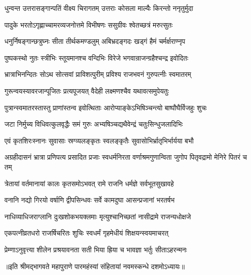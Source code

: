 \twolineshloka
{धुन्वन्त उत्तरासङ्गान्पतिं वीक्ष्य चिरागतम्}
{उत्तराः कोसला माल्यैः किरन्तो ननृतुर्मुदा} %

\twolineshloka
{पादुके भरतोऽगृह्णाच्चामरव्यजनोत्तमे}
{विभीषणः ससुग्रीवः श्वेतच्छत्रं मरुत्सुतः} %

\twolineshloka
{धनुर्निषङ्गान्छत्रुघ्नः सीता तीर्थकमण्डलुम्}
{अबिभ्रदङ्गदः खड्गं हैमं चर्मर्क्षराण्नृप} %

\twolineshloka
{पुष्पकस्थो नुतः स्त्रीभिः स्तूयमानश्च वन्दिभिः}
{विरेजे भगवान्राजन्ग्रहैश्चन्द्र इवोदितः} %

\twolineshloka
{भ्रात्राभिनन्दितः सोऽथ सोत्सवां प्राविशत्पुरीम्}
{प्रविश्य राजभवनं गुरुपत्नीः स्वमातरम्} %

\twolineshloka
{गुरून्वयस्यावरजान्पूजितः प्रत्यपूजयत्}
{वैदेही लक्ष्मणश्चैव यथावत्समुपेयतुः} %

\twolineshloka
{पुत्रान्स्वमातरस्तास्तु प्राणांस्तन्व इवोत्थिताः}
{आरोप्याङ्केऽभिषिञ्चन्त्यो बाष्पौघैर्विजहुः शुचः} %

\twolineshloka
{जटा निर्मुच्य विधिवत्कुलवृद्धैः समं गुरुः}
{अभ्यषिञ्चद्यथैवेन्द्रं चतुःसिन्धुजलादिभिः} %

\twolineshloka
{एवं कृतशिरःस्नानः सुवासाः स्रग्व्यलङ्कृतः}
{स्वलङ्कृतैः सुवासोभिर्भ्रातृभिर्भार्यया बभौ} %

\threelineshloka
{अग्रहीदासनं भ्रात्रा प्रणिपत्य प्रसादित}
{प्रजाः स्वधर्मनिरता वर्णाश्रमगुणान्विता}
{जुगोप पितृवद्रामो मेनिरे पितरं च तम्} %

\twolineshloka
{त्रेतायां वर्तमानायां कालः कृतसमोऽभवत्}
{रामे राजनि धर्मज्ञे सर्वभूतसुखावहे} %

\twolineshloka
{वनानि नद्यो गिरयो वर्षाणि द्वीपसिन्धवः}
{सर्वे कामदुघा आसन्प्रजानां भरतर्षभ} %

\twolineshloka
{नाधिव्याधिजराग्लानि दुःखशोकभयक्लमाः}
{मृत्युश्चानिच्छतां नासीद्रामे राजन्यधोक्षजे} %

\twolineshloka
{एकपत्नीव्रतधरो राजर्षिचरितः शुचिः}
{स्वधर्मं गृहमेधीयं शिक्षयन्स्वयमाचरत्} %

\twolineshloka
{प्रेम्णाऽनुवृत्त्या शीलेन प्रश्रयावनता सती}
{भिया ह्रिया च भावज्ञा भर्तुः सीताऽहरन्मनः} %

॥इति श्रीमद्भागवते महापुराणे पारमहंस्यां संहितायां नवमस्कन्धे दशमोऽध्यायः॥

\closesection